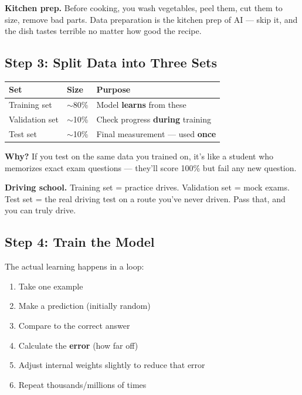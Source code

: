 \documentclass[11pt,a4paper]{report}
\begin{document}
\begin{analogybox}
\textbf{Kitchen prep.} Before cooking, you wash vegetables, peel them, cut them to size, remove bad parts. Data preparation is the kitchen prep of AI --- skip it, and the dish tastes terrible no matter how good the recipe.
\end{analogybox}

\subsection{Step 3: Split Data into Three Sets}

\begin{table}[h]
\centering
\begin{tabularx}{\textwidth}{l l X}
\toprule
\textbf{Set} & \textbf{Size} & \textbf{Purpose} \\
\midrule
Training set & $\sim$80\% & Model \textbf{learns} from these \\
Validation set & $\sim$10\% & Check progress \textbf{during} training \\
Test set & $\sim$10\% & Final measurement --- used \textbf{once} \\
\bottomrule
\end{tabularx}
\end{table}

\textbf{Why?} If you test on the same data you trained on, it's like a student who memorizes exact exam questions --- they'll score 100\% but fail any new question.

\begin{analogybox}
\textbf{Driving school.} Training set = practice drives. Validation set = mock exams. Test set = the real driving test on a route you've never driven. Pass that, and you can truly drive.
\end{analogybox}

\subsection{Step 4: Train the Model}

The actual learning happens in a loop:

\begin{enumerate}
    \item Take one example
    \item Make a prediction (initially random)
    \item Compare to the correct answer
    \item Calculate the \textbf{error} (how far off)
    \item Adjust internal weights slightly to reduce that error
    \item Repeat thousands/millions of times
\end{enumerate}
\end{document}
